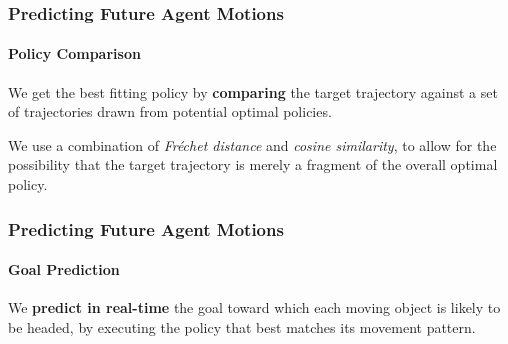 \begin{frame}
	\frametitle{Predicting Future Agent Motions}
	\framesubtitle{Policy Comparison}
	
	\LARGE
	
	\vspace{0.1cm}
	
	We get the best fitting policy by \textbf{comparing} the target trajectory against a
	set of trajectories drawn from potential optimal policies. \\
	
	\vspace{0.4cm}
	
	We use a combination of \emph{Fr\'echet distance} and \emph{cosine similarity}, to
	allow for the possibility that the target trajectory is merely a fragment of the
	overall optimal policy. \\
\end{frame}

\begin{frame}
	\frametitle{Predicting Future Agent Motions}
	\framesubtitle{Goal Prediction}
	
	\Large
	
	\vspace{0.25cm}
	
	We \textbf{predict in real-time} the goal toward which each moving object is likely to be headed,
	by executing the policy that best matches its movement pattern.
	
	\vspace{-0.1cm}
	
	\begin{center}
	\end{center}
\end{frame}

